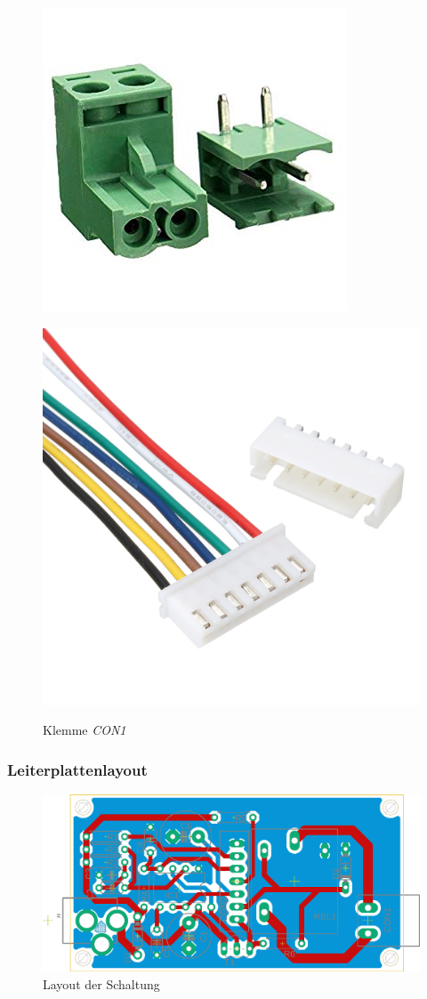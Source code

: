 \documentclass[a4paper, 12pt]{article}
\begin{document}
    \begin{figure}[H]
    \centering
    \begin{minipage}{.5\textwidth}
      \centering
      \includegraphics[width=.4\linewidth]{graphics/jiemin.jpg}
      \caption[Caption for LOF]{Klemme \emph{CON1}}
      \label{fig:3}
    \end{minipage}%
    \begin{minipage}{.5\textwidth}
      \centering
      \includegraphics[width=.4\linewidth]{graphics/JST.png}
      \label{fig:4}
    \end{minipage}
    \end{figure}

    \subsubsection{Leiterplattenlayout}

        \begin{figure}[h]
        \begin{center}
          \includegraphics[page=1, scale=0.5]{graphics/layout.pdf}
          \caption{Layout der Schaltung}
          \label{fig:layout}
        \end{center}
        \end{figure}
\end{document}
